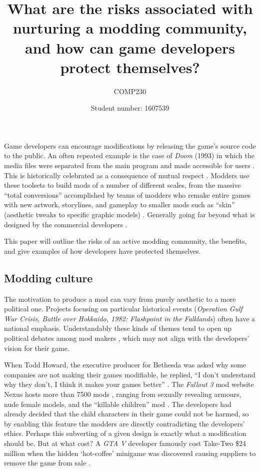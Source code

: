 \documentclass{scrartcl}
\title{What are the risks associated with nurturing a modding community, and how can game developers protect themselves?}
\subtitle{COMP230}
\author{Student number: 1607539}
\begin{document}
\maketitle

Game developers can encourage modifications by releasing the game's source code to the public. An often repeated example is the case of \textit{Doom} (1993) in which the media files were separated from the main program and made accessible for users \cite{sotamaa2010game}. This is historically celebrated as a consequence of mutual respect \cite{hong2013game}. Modders use these toolsets to build mods of a number of different scales, from the massive ``total conversions'' accomplished by teams of modders who remake entire games with new artwork, storylines, and gameplay to smaller mods such as ``skin'' (aesthetic tweaks to specific graphic models) \cite{hong2014becoming}.  Generally going far beyond what is designed by the commercial developers \cite{postigo2007mods}.

This paper will outline the risks of an active modding community, the benefits, and give examples of how developers have protected themselves.

\subsection*{Modding culture}

The motivation to produce a mod can vary from purely aesthetic to a more political one. Projects focusing on particular historical events (\textit{Operation Gulf War Crisis, Battle over Hokkaido, 1982: Flashpoint in the Falklands}) often have a national emphasis. Understandably these kinds of themes tend to open up political debates among mod makers \cite{sotamaa2010game}, which may not align with the developers' vision for their game.

When Todd Howard, the executive producer for Bethesda was asked why some companies are not making their games modifiable, he replied, ``I don't understand why they don't, I think it makes your games better'' \cite{todd2012}. The \textit{Fallout 3} mod website Nexus hosts more than 7500 mods \cite{bostan2010explorations}, ranging from sexually revealing armours, nude female models, and the ``killable children'' mod \cite{bostan2010explorations}. The developers had already decided that the child characters in their game could not be harmed, so by enabling this feature the modders are directly contradicting the developers' ethics. Perhaps this subverting of a given design is exactly what a modification should be. But at what cost? A \textit{GTA V} developer famously cost Take-Two {\$}24 million when the hidden `hot-coffee' minigame was discovered causing suppliers to remove the game from sale \cite{hotcoffee1}.
\end{document}
